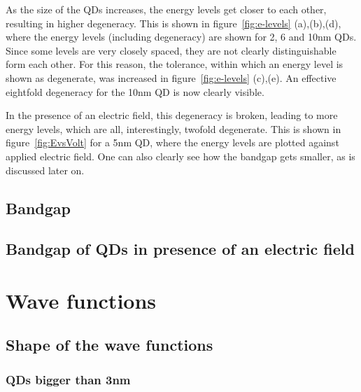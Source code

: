 As the size of the QDs increases, the energy levels get closer to each other, resulting in higher degeneracy. This is shown in figure~\ref{fig:e-levels} (a),(b),(d), where the energy levels (including degeneracy) are shown for 2, 6 and 10nm QDs. Since some levels are very closely spaced, they are not clearly distinguishable form each other. For this reason, the tolerance, within which an energy level is shown as degenerate, was increased in figure~\ref{fig:e-levels} (c),(e). An effective eightfold degeneracy for the 10nm QD is now clearly visible.
	
In the presence of an electric field, this degeneracy is broken, leading to more energy levels, which are all, interestingly, twofold degenerate. This is shown in figure~\ref{fig:EvsVolt} for a 5nm QD, where the energy levels are plotted against applied electric field. One can also clearly see how the bandgap gets smaller, as is discussed later on.
\FloatBarrier
\subsection{Bandgap} 

\subsection{Bandgap of QDs in presence of an electric field}

\section{Wave functions}

\subsection{Shape of the wave functions}

\subsubsection{QDs bigger than 3nm} 

